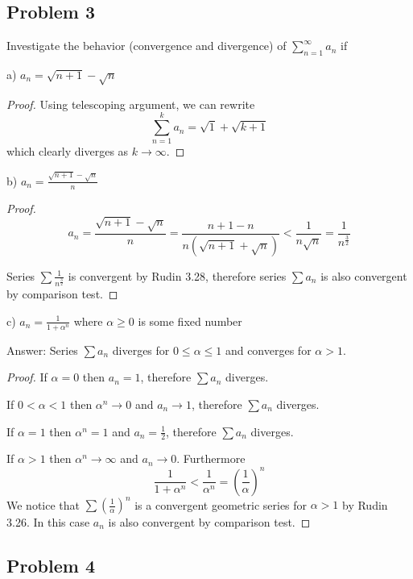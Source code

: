 \documentclass{article}
\begin{document}
\subsection*{Problem 3}

\begin{tcolorbox}
Investigate the behavior (convergence and divergence) of $\sum_{n=1}^\infty a_n$ if

a) $ a_n = \sqrt{n+1} - \sqrt{n}$
\end{tcolorbox}

\begin{proof}
Using telescoping argument, we can rewrite 
$$ \sum_{n=1}^k a_n = \sqrt{1} + \sqrt{k+1} $$
which clearly diverges as $k \to \infty$.
\end{proof}

\begin{tcolorbox}
b) $ a_n = \frac{\sqrt{n+1} - \sqrt{n}}{n}$
\end{tcolorbox}

\begin{proof}
$$ a_n = \frac{\sqrt{n+1} - \sqrt{n}}{n} = \frac{n+1-n}{n(\sqrt{n+1}+\sqrt{n})} < 
\frac{1}{n \sqrt{n}} = \frac{1}{n^{\frac{3}{2}}}
$$

Series $\sum \frac{1}{n^{\frac{3}{2}}} $ is convergent by Rudin 3.28, therefore series $\sum a_n$ is also convergent by comparison test.
\end{proof}

\begin{tcolorbox}
c) $a_n = \frac{1}{1+\alpha^n}$ where $\alpha \geq 0$ is some fixed number
\end{tcolorbox}
Answer: Series $\sum a_n$ diverges for $0 \leq \alpha \leq 1$ and converges for $\alpha > 1$.
\begin{proof}
If $\alpha = 0$ then $a_n = 1$, therefore $\sum a_n$ diverges.

If $0 < \alpha < 1$ then $\alpha^n \to 0$ and $a_n \to 1$, therefore $\sum a_n$ diverges.

If $\alpha = 1$ then $\alpha^n = 1$ and $a_n = \frac{1}{2}$, therefore $\sum a_n$ diverges.

If $\alpha > 1$ then $\alpha^n \to \infty$ and $a_n \to 0$. Furthermore
$$ \frac{1}{1+\alpha^n} < \frac{1}{\alpha^n} = \left( \frac{1}{\alpha} \right)^n $$
We notice that $\sum (\frac{1}{\alpha})^n$ is a convergent geometric series for $\alpha>1$ by Rudin 3.26. In this case $a_n$ is also convergent by comparison test.
\end{proof}


\subsection*{Problem 4}
\end{document}
